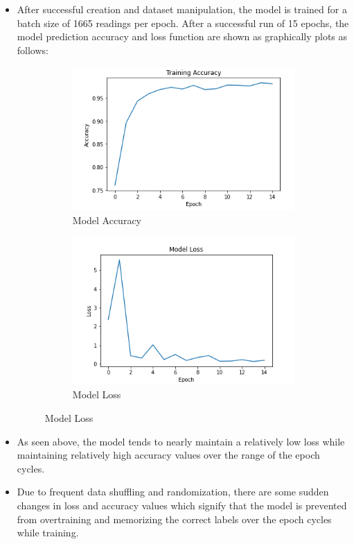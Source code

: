 \begin{itemize}
  \item After successful creation and dataset manipulation, the model is trained for a batch size of 1665 readings per epoch. After a successful run of 15 epochs, the model prediction accuracy and loss function are shown as graphically plots as follows:
    \begin{figure}[H]
      \begin{subfigure}{0.5\textwidth}
        \includegraphics[width=0.9\linewidth]{ images/Model-Accuracy.png }
        \caption{Model Accuracy}
        \label{fig:subim5}
      \end{subfigure}
      \begin{subfigure}{0.5\textwidth}
        \includegraphics[width=0.9\linewidth]{ images/Model-Loss-Acc.png }
        \caption{Model Loss}
        \label{fig:subim5}
      \end{subfigure}
    \end{figure}

  \item As seen above, the model tends to nearly maintain a relatively low loss while maintaining relatively high accuracy values over the range of the epoch cycles.

  \item Due to frequent data shuffling and randomization, there are some sudden changes in loss and accuracy values which signify that the model is prevented from overtraining and memorizing the correct labels over the epoch cycles while training.
\end{itemize}

